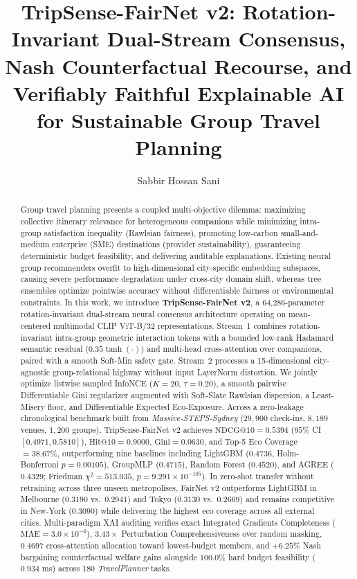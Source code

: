 \documentclass[preprint,12pt]{elsarticle}
\begin{document}
\begin{frontmatter}

\title{TripSense-FairNet v2: Rotation-Invariant Dual-Stream Consensus, Nash Counterfactual Recourse, and Verifiably Faithful Explainable AI for Sustainable Group Travel Planning}

\author[diu]{Sabbir Hossan Sani}

\begin{abstract}
Group travel planning presents a coupled multi-objective dilemma: maximizing collective itinerary relevance for heterogeneous companions while minimizing intra-group satisfaction inequality (Rawlsian fairness), promoting low-carbon small-and-medium enterprise (SME) destinations (provider sustainability), guaranteeing deterministic budget feasibility, and delivering auditable explanations. Existing neural group recommenders overfit to high-dimensional city-specific embedding subspaces, causing severe performance degradation under cross-city domain shift, whereas tree ensembles optimize pointwise accuracy without differentiable fairness or environmental constraints. In this work, we introduce \textbf{TripSense-FairNet v2}, a 64,286-parameter rotation-invariant dual-stream neural consensus architecture operating on mean-centered multimodal CLIP ViT-B/32 representations. Stream~1 combines rotation-invariant intra-group geometric interaction tokens with a bounded low-rank Hadamard semantic residual ($0.35\tanh(\cdot)$) and multi-head cross-attention over companions, paired with a smooth Soft-Min safety gate. Stream~2 processes a 15-dimensional city-agnostic group-relational highway without input LayerNorm distortion. We jointly optimize listwise sampled InfoNCE ($K{=}20$, $\tau{=}0.20$), a smooth pairwise Differentiable Gini regularizer augmented with Soft-Slate Rawlsian dispersion, a Least-Misery floor, and Differentiable Expected Eco-Exposure. Across a zero-leakage chronological benchmark built from \textit{Massive-STEPS-Sydney} ($29{,}900$ check-ins, $8{,}189$ venues, $1{,}200$ groups), TripSense-FairNet v2 achieves $\text{NDCG@10} = 0.5394$ ($95\%$ CI $[0.4971, 0.5810]$), $\text{Hit@10} = 0.9000$, $\text{Gini} = 0.0630$, and Top-5 Eco Coverage $= 38.67\%$, outperforming nine baselines including LightGBM ($0.4736$, Holm-Bonferroni $p = 0.00105$), GroupMLP ($0.4715$), Random Forest ($0.4520$), and AGREE ($0.4329$; Friedman $\chi^2 = 513.035$, $p = 9.291 \times 10^{-105}$). In zero-shot transfer without retraining across three unseen metropolises, FairNet v2 outperforms LightGBM in Melbourne ($0.3190$ vs.\ $0.2941$) and Tokyo ($0.3130$ vs.\ $0.2669$) and remains competitive in New-York ($0.3090$) while delivering the highest eco coverage across all external cities. Multi-paradigm XAI auditing verifies exact Integrated Gradients Completeness ($\text{MAE} = 3.0 \times 10^{-6}$), $3.43\times$ Perturbation Comprehensiveness over random masking, $0.4697$ cross-attention allocation toward lowest-budget members, and $+6.25\%$ Nash bargaining counterfactual welfare gains alongside $100.0\%$ hard budget feasibility ($0.934\text{ ms}$) across 180 \textit{TravelPlanner} tasks.

\end{abstract}
\end{frontmatter}
\end{document}
